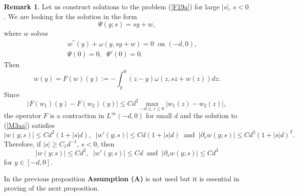 \documentclass[a4paper,reqno,12pt]{amsart}
\theoremstyle{plain}
\theoremstyle{definition}
\newtheorem{remark}[theorem]{Remark}
\numberwithin{equation}{section}
\begin{document}
\begin{remark} Let us construct solutions to the problem (\ref{F19a}) for large $|s|$, $s<0$. We are looking for the solution in the form
$$
\Psi(y;s)=sy+w,
$$
where $w$ solves
\begin{eqnarray}\label{M3az}
&&w^{''}(y)+\omega(y,sy+w)=0\;\;\mbox{on $(-d,0)$},\nonumber\\
&&\Psi(0)=0,\;\;\Psi'(0)=0.
\end{eqnarray}
Then
\begin{equation}\label{M3aa}
w(y)=F(w)(y):=-\int_y^0(z-y)\omega(z,sz+w(z))dz.
\end{equation}
Since
$$
|F(w_1)(y)-F(w_2)(y)|\leq Cd^2\max_{-d\leq z\leq 0} |w_1(z)-w_2(z)|,
$$
the operator $F$ is a contraction in $L^\infty(-d,0)$ for small $d$ and the solution to (\ref{M3aa}) satisfies
$$
|w(y;s)|\leq C d^2(1+|s|d),\;\;|w'(y;s)|\leq C d(1+|s|d)\;\;\mbox{and}\;\;
|\partial_s w(y;s)|\leq C d^3(1+|s|d)^2.
$$
Therefore, if $|s|\geq C_1d^{-1}$, $s<0$, then
$$
|w(y;s)|\leq Cd^2,\;\;|w'(y;s)|\leq Cd\;\;\mbox{and}\;\;|\partial_s w(y;s)|\leq Cd^3
$$
for $y\in [-d,0]$.
\end{remark}







In the previous proposition {\bf Assumption (A)} is not used but it
 is essential in proving of the next proposition.
\end{document}
